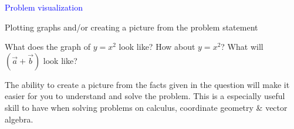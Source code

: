 \documentclass[14pt,fleqn]{extarticle}
\begin{document}
\begin{skill}
\begin{narrow}
\textcolor{blue}{Problem visualization}

Plotting graphs and/or creating a picture from the problem statement
\end{narrow}

\reason 

What does the graph of $y=x^2$ look like? How about $y = x^2$? What will $\left(\vec{a} + \vec{b} \right)$ look like? \newline 

The ability to create a picture from the facts given in the question will make it easier for you to understand and solve the problem. This is a especially useful skill to have when solving problems on calculus, coordinate geometry \& vector algebra. 
\end{skill}
\end{document}
